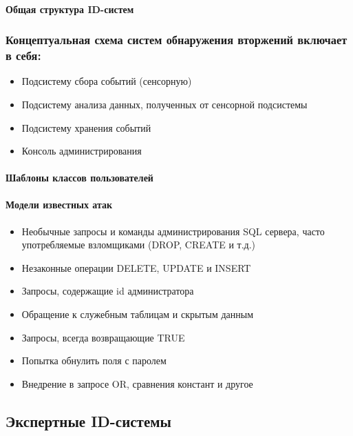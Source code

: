 

\paragraph{Общая структура ID-систем} 

\subsubsection*{Концептуальная схема систем обнаружения вторжений включает в себя:}
\begin{itemize}
	\item Подсистему сбора событий (сенсорную)
	\item Подсистему анализа данных, полученных от сенсорной подсистемы
	\item Подсистему хранения событий
	\item Консоль администрирования
\end{itemize}

\paragraph{Шаблоны классов пользователей}

\paragraph{Модели известных атак}
\begin{itemize}
	\item Необычные запросы и команды администрирования SQL сервера, часто употребляемые взломщиками (DROP, CREATE и т.д.)
	\item Незаконные операции DELETE, UPDATE и INSERT
	\item Запросы, содержащие id администратора
	\item Обращение к служебным таблицам и скрытым данным
	\item Запросы, всегда возвращающие TRUE
	\item Попытка обнулить поля с паролем
	\item Внедрение в запросе OR, сравнения констант и другое
\end{itemize}

\subsection{Экспертные ID-системы}

